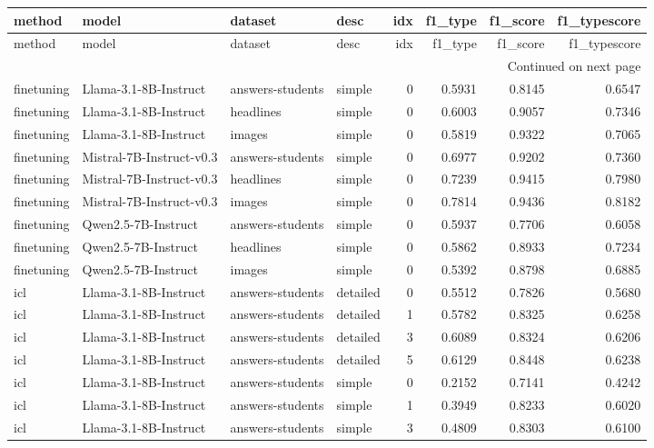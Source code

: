 \begin{longtable}{llllrrrr}
\toprule
method & model & dataset & desc & idx & f1_type & f1_score & f1_typescore \\
\midrule
\endfirsthead
\toprule
method & model & dataset & desc & idx & f1_type & f1_score & f1_typescore \\
\midrule
\endhead
\midrule
\multicolumn{8}{r}{Continued on next page} \\
\midrule
\endfoot
\bottomrule
\endlastfoot
finetuning & Llama-3.1-8B-Instruct & answers-students & simple & 0 & 0.5931 & 0.8145 & 0.6547 \\
finetuning & Llama-3.1-8B-Instruct & headlines & simple & 0 & 0.6003 & 0.9057 & 0.7346 \\
finetuning & Llama-3.1-8B-Instruct & images & simple & 0 & 0.5819 & 0.9322 & 0.7065 \\
finetuning & Mistral-7B-Instruct-v0.3 & answers-students & simple & 0 & 0.6977 & 0.9202 & 0.7360 \\
finetuning & Mistral-7B-Instruct-v0.3 & headlines & simple & 0 & 0.7239 & 0.9415 & 0.7980 \\
finetuning & Mistral-7B-Instruct-v0.3 & images & simple & 0 & 0.7814 & 0.9436 & 0.8182 \\
finetuning & Qwen2.5-7B-Instruct & answers-students & simple & 0 & 0.5937 & 0.7706 & 0.6058 \\
finetuning & Qwen2.5-7B-Instruct & headlines & simple & 0 & 0.5862 & 0.8933 & 0.7234 \\
finetuning & Qwen2.5-7B-Instruct & images & simple & 0 & 0.5392 & 0.8798 & 0.6885 \\
icl & Llama-3.1-8B-Instruct & answers-students & detailed & 0 & 0.5512 & 0.7826 & 0.5680 \\
icl & Llama-3.1-8B-Instruct & answers-students & detailed & 1 & 0.5782 & 0.8325 & 0.6258 \\
icl & Llama-3.1-8B-Instruct & answers-students & detailed & 3 & 0.6089 & 0.8324 & 0.6206 \\
icl & Llama-3.1-8B-Instruct & answers-students & detailed & 5 & 0.6129 & 0.8448 & 0.6238 \\
icl & Llama-3.1-8B-Instruct & answers-students & simple & 0 & 0.2152 & 0.7141 & 0.4242 \\
icl & Llama-3.1-8B-Instruct & answers-students & simple & 1 & 0.3949 & 0.8233 & 0.6020 \\
icl & Llama-3.1-8B-Instruct & answers-students & simple & 3 & 0.4809 & 0.8303 & 0.6100 \\

\end{longtable}
